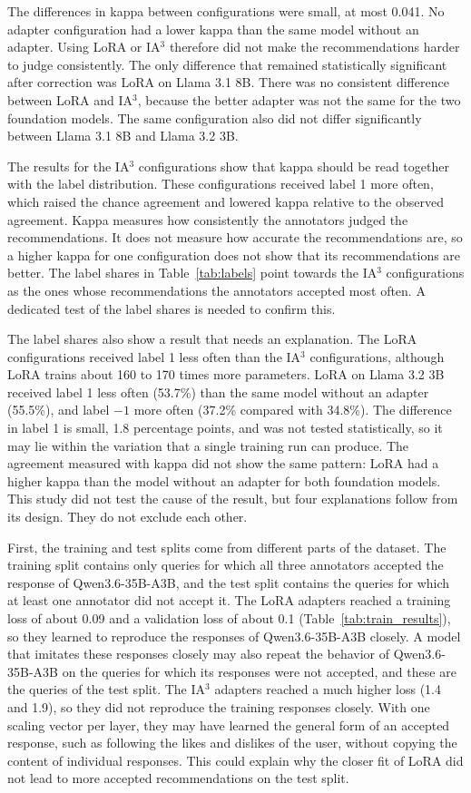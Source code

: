 \documentclass[journal,article,submit,pdftex,moreauthors]{Definitions/mdpi}
\begin{document}
The differences in kappa between configurations were small, at most 0.041. No adapter configuration had a lower kappa than the same model without an adapter. Using LoRA or IA$^3$ therefore did not make the recommendations harder to judge consistently. The only difference that remained statistically significant after correction was LoRA on Llama 3.1 8B. There was no consistent difference between LoRA and IA$^3$, because the better adapter was not the same for the two foundation models. The same configuration also did not differ significantly between Llama 3.1 8B and Llama 3.2 3B.

The results for the IA$^3$ configurations show that kappa should be read together with the label distribution. These configurations received label 1 more often, which raised the chance agreement and lowered kappa relative to the observed agreement. Kappa measures how consistently the annotators judged the recommendations. It does not measure how accurate the recommendations are, so a higher kappa for one configuration does not show that its recommendations are better. The label shares in Table~\ref{tab:labels} point towards the IA$^3$ configurations as the ones whose recommendations the annotators accepted most often. A dedicated test of the label shares is needed to confirm this.

The label shares also show a result that needs an explanation. The LoRA configurations received label 1 less often than the IA$^3$ configurations, although LoRA trains about 160 to 170 times more parameters. LoRA on Llama 3.2 3B received label 1 less often (53.7\%) than the same model without an adapter (55.5\%), and label $-1$ more often (37.2\% compared with 34.8\%). The difference in label 1 is small, 1.8 percentage points, and was not tested statistically, so it may lie within the variation that a single training run can produce. The agreement measured with kappa did not show the same pattern: LoRA had a higher kappa than the model without an adapter for both foundation models. This study did not test the cause of the result, but four explanations follow from its design. They do not exclude each other.

First, the training and test splits come from different parts of the dataset. The training split contains only queries for which all three annotators accepted the response of Qwen3.6-35B-A3B, and the test split contains the queries for which at least one annotator did not accept it. The LoRA adapters reached a training loss of about 0.09 and a validation loss of about 0.1 (Table~\ref{tab:train_results}), so they learned to reproduce the responses of Qwen3.6-35B-A3B closely. A model that imitates these responses closely may also repeat the behavior of Qwen3.6-35B-A3B on the queries for which its responses were not accepted, and these are the queries of the test split. The IA$^3$ adapters reached a much higher loss (1.4 and 1.9), so they did not reproduce the training responses closely. With one scaling vector per layer, they may have learned the general form of an accepted response, such as following the likes and dislikes of the user, without copying the content of individual responses. This could explain why the closer fit of LoRA did not lead to more accepted recommendations on the test split.
\end{document}
